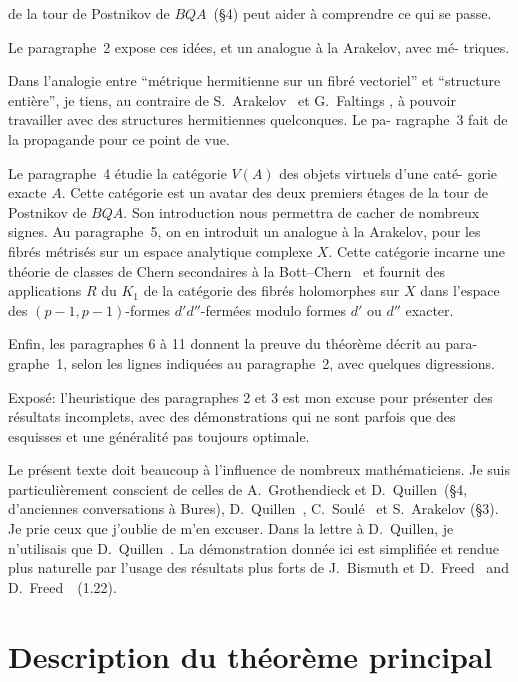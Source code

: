\documentclass[12pt,a4paper]{article}
\theoremstyle{plain}
\theoremstyle{definition}
\begin{document}
\newpage
\noindent de la tour de Postnikov de $BQA$~(\S4) peut aider \`a comprendre ce qui se passe.

Le paragraphe~2 expose ces id\'ees, et un analogue \`a la Arakelov, avec m\'e-
triques.

Dans l'analogie entre ``m\'etrique hermitienne sur un fibr\'e vectoriel'' et
``structure enti\`ere'', je tiens, au contraire de S.~Arakelov~\cite{1}\cite{2} et G.~Faltings
\cite{5}, \`a pouvoir travailler avec des structures hermitiennes quelconques. Le pa-
ragraphe~3 fait de la propagande pour ce point de vue.

Le paragraphe~4 \'etudie la cat\'egorie $V(A)$ des objets virtuels d'une cat\'e-
gorie exacte $A$. Cette cat\'egorie est un avatar des deux premiers \'etages de
la tour de Postnikov de $BQA$. Son introduction nous permettra de cacher de
nombreux signes. Au paragraphe~5, on en introduit un analogue \`a la Arakelov,
pour les fibr\'es m\'etris\'es sur un espace analytique complexe $X$. Cette cat\'egorie
incarne une th\'eorie de classes de Chern secondaires \`a la Bott--Chern~\cite{4} et fournit
des applications $R$ du $K_1$ de la cat\'egorie des fibr\'es holomorphes sur $X$
dans l'espace des $(p-1,p-1)$-formes $d'd''$-ferm\'ees modulo formes $d'$ ou $d''$
exacter.

Enfin, les paragraphes 6 \`a 11 donnent la preuve du th\'eor\`eme d\'ecrit au para-
graphe~1, selon les lignes indiqu\'ees au paragraphe~2, avec quelques digressions.

Expos\'e: l'heuristique des paragraphes 2 et 3 est mon excuse pour pr\'esenter
des r\'esultats incomplets, avec des d\'emonstrations qui ne sont parfois que des
esquisses et une g\'en\'eralit\'e pas toujours optimale.

Le pr\'esent texte doit beaucoup \`a l'influence de nombreux math\'ematiciens. Je
suis particuli\`erement conscient de celles de A.~Grothendieck et D.~Quillen~(\S4,
d'anciennes conversations \`a Bures), D.~Quillen~\cite{13}, C.~Soul\'e~\cite{14} et S.~Arakelov
(\S3). Je prie ceux que j'oublie de m'en excuser. Dans la lettre \`a D.~Quillen,
je n'utilisais que D.~Quillen~\cite{13}. La d\'emonstration donn\'ee ici est simplifi\'ee
et rendue plus naturelle par l'usage des r\'esultats plus forts de J.~Bismuth et
D.~Freed~\cite{3} and D.~Freed~\cite{6}~(1.22).

\newpage

\tableofcontents

\newpage

\section{Description du th\'eor\`eme principal}
\end{document}
